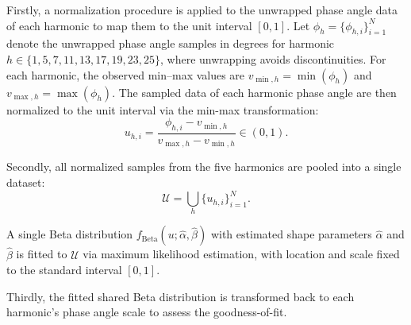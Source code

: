 Firstly, a normalization procedure is applied to the unwrapped phase angle data of each harmonic to map them to the unit interval $[0,1]$. Let $\phi_h = \{\phi_{h,i}\}_{i=1}^{N}$ denote the unwrapped phase angle samples in degrees for harmonic $h \in \{1, 5, 7, 11, 13, 17, 19, 23, 25\}$, where unwrapping avoids discontinuities. For each harmonic, the observed min–max values are $v_{\min,h} = \min(\phi_h)$ and $v_{\max,h} = \max(\phi_h)$.
The sampled data of each harmonic phase angle are then normalized to the unit interval via the min-max transformation:
\begin{equation}
u_{h,i} = \frac{\phi_{h,i} - v_{\min,h}}{v_{\max,h} - v_{\min,h}} \in (0,1).
\end{equation}

Secondly, all normalized samples from the five harmonics are pooled into a single dataset:
\begin{equation}
\mathcal{U} = \bigcup_{h} \{u_{h,i}\}_{i=1}^{N}.
\end{equation}



A single Beta distribution $f_{\mathrm{Beta}}(u; \hat{\alpha}, \hat{\beta})$ with estimated shape parameters $\hat{\alpha}$ and $\hat{\beta}$ is fitted to $\mathcal{U}$ via maximum likelihood estimation, with location and scale fixed to the standard interval $[0,1]$.

Thirdly, the fitted shared Beta distribution is transformed back to each harmonic's phase angle scale to assess the goodness-of-fit.

